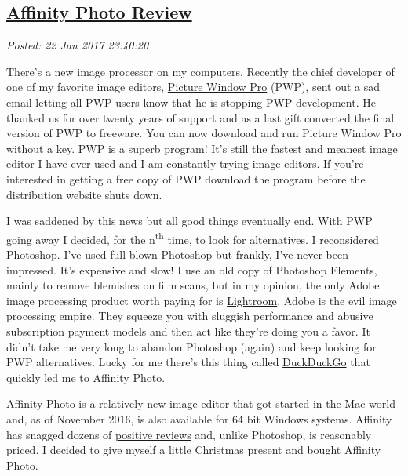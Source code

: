 %

\subsection*{\href{https://analyzethedatanotthedrivel.org/2017/01/22/affinity-photo-review/}{Affinity Photo Review}}


\noindent\emph{Posted: 22 Jan 2017 23:40:20}
\vspace{6pt}

There's a new image processor on my computers. Recently the chief
developer of one of my favorite image editors,
\href{http://www.dl-c.com/}{Picture Window Pro} (PWP), sent out a sad
email letting all PWP users know that he is stopping PWP development. He
thanked us for over twenty years of support and as a last gift converted
the final version of PWP to freeware. You can now download and run
Picture Window Pro without a key. PWP is a superb program! It's still
the fastest and meanest image editor I have ever used and I am
constantly trying image editors. If you're interested in getting a free
copy of PWP download the program before the distribution website shuts
down.

I was saddened by this news but all good things eventually end. With PWP
going away I decided, for the n\textsuperscript{th} time, to look for
alternatives. I reconsidered Photoshop. I've used full-blown Photoshop
but frankly, I've never been impressed. It's expensive and slow! I use
an old copy of Photoshop Elements, mainly to remove blemishes on film
scans, but in my opinion, the only Adobe image processing product worth
paying for is
\href{https://www.adobe.com/products/photoshop-lightroom.html}{Lightroom}.
Adobe is the evil image processing empire. They squeeze you with
sluggish performance and abusive subscription payment models and then
act like they're doing you a favor. It didn't take me very long to
abandon Photoshop (again) and keep looking for PWP alternatives. Lucky
for me there's this thing called
\href{https://start.duckduckgo.com/}{DuckDuckGo} that quickly led me to
\href{https://affinity.serif.com/en-us/}{Affinity Photo.}

Affinity Photo is a relatively new image editor that got started in the
Mac world and, as of November 2016, is also available for 64 bit Windows
systems. Affinity has snagged dozens of
\href{https://fstoppers.com/photoshop/affinity-photo-finally-true-alternative-photoshop-windows-153211}{positive
reviews} and, unlike Photoshop, is reasonably priced. I decided to give
myself a little Christmas present and bought Affinity Photo.

